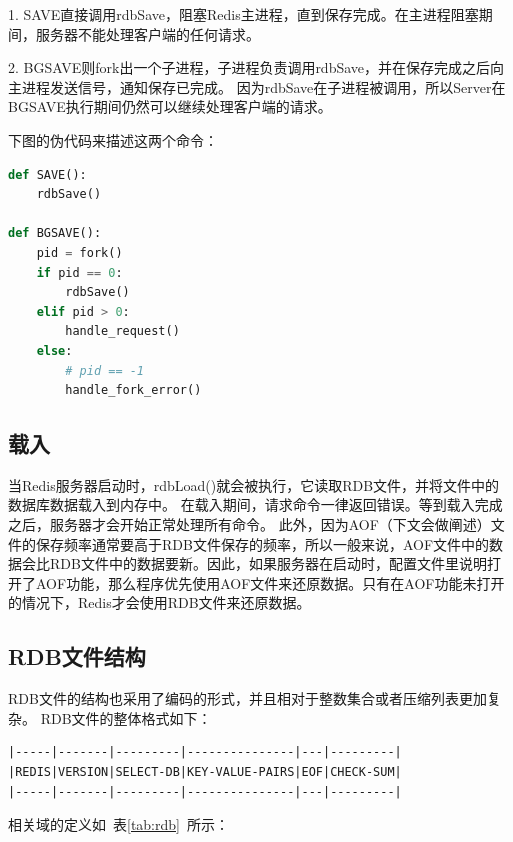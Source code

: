 \documentclass{zjutthesis}
\begin{document}
1. SAVE直接调用rdbSave，阻塞Redis主进程，直到保存完成。在主进程阻塞期间，服务器不能处理客户端的任何请求。

2. BGSAVE则fork出一个子进程，子进程负责调用rdbSave，并在保存完成之后向主进程发送信号，通知保存已完成。
因为rdbSave在子进程被调用，所以Server在BGSAVE执行期间仍然可以继续处理客户端的请求。

下图的伪代码来描述这两个命令：
\begin{lstlisting}[language=Python]
def SAVE():
    rdbSave()

def BGSAVE():
    pid = fork()
    if pid == 0:
        rdbSave()
    elif pid > 0:
        handle_request()
    else:
        # pid == -1
        handle_fork_error()
\end{lstlisting}

\subsection{载入}
当Redis服务器启动时，rdbLoad()就会被执行，它读取RDB文件，并将文件中的数据库数据载入到内存中。
在载入期间，请求命令一律返回错误。等到载入完成之后，服务器才会开始正常处理所有命令。
此外，因为AOF（下文会做阐述）文件的保存频率通常要高于RDB文件保存的频率，所以一般来说，AOF文件中的数据会比RDB文件中的数据要新。因此，如果服务器在启动时，配置文件里说明打开了AOF功能，那么程序优先使用AOF文件来还原数据。只有在AOF功能未打开的情况下，Redis才会使用RDB文件来还原数据。

\subsection{RDB文件结构}
RDB文件的结构也采用了编码的形式，并且相对于整数集合或者压缩列表更加复杂。
RDB文件的整体格式如下：
\begin{verbatim}
|-----|-------|---------|---------------|---|---------|
|REDIS|VERSION|SELECT-DB|KEY-VALUE-PAIRS|EOF|CHECK-SUM|
|-----|-------|---------|---------------|---|---------|
\end{verbatim}
相关域的定义如~表\ref{tab:rdb}~所示：
\begin{table}[htbp]
\caption{RDB文件结构}\label{tab:rdb}
\vspace{\baselineskip}
\end{table}
\end{document}
